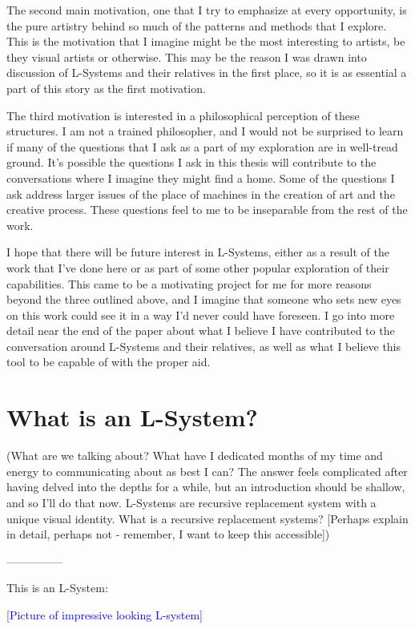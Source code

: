 \documentclass[12pt,twoside]{reedthesis}
\begin{document}
	The second main motivation, one that I try to emphasize at every opportunity, is the pure artistry behind so much of the patterns and methods that I explore. This is the motivation that I imagine might be the most interesting to artists, be they visual artists or otherwise. This may be the reason I was drawn into discussion of L-Systems and their relatives in the first place, so it is as essential a part of this story as the first motivation. 
	
	The third motivation is interested in a philosophical perception of these structures. I am not a trained philosopher, and I would not be surprised to learn if many of the questions that I ask as a part of my exploration are in well-tread ground. It’s possible the questions I ask in this thesis will contribute to the conversations where I imagine they might find a home. Some of the questions I ask address larger issues of the place of machines in the creation of art and the creative process. These questions feel to me to be inseparable from the rest of the work.
	
	I hope that there will be future interest in L-Systems, either as a result of the work that I’ve done here or as part of some other popular exploration of their capabilities. This came to be a motivating project for me for more reasons beyond the three outlined above, and I imagine that someone who sets new eyes on this work could see it in a way I’d never could have foreseen. I go into more detail near the end of the paper about what I believe I have contributed to the conversation around L-Systems and their relatives, as well as what I believe this tool to be capable of with the proper aid.

	
\chapter{What is an L-System?}
    	(What are we talking about? What have I dedicated months of my time and energy to communicating about as best I can? The answer feels complicated after having delved into the depths for a while, but an introduction should be shallow, and so I’ll do that now. L-Systems are recursive replacement system with a unique visual identity. What is a recursive replacement systems? [Perhaps explain in detail, perhaps not - remember, I want to keep this accessible])

—————

This is an L-System:

\textcolor{blue}{[Picture of impressive looking L-system]}
\end{document}
